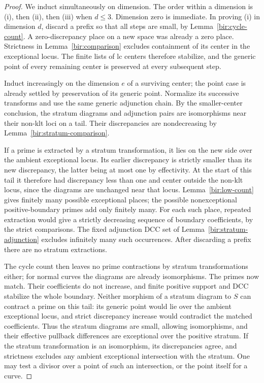 \documentclass[11pt,letterpaper]{article}
\theoremstyle{definition}
\theoremstyle{remark}
\begin{document}
\begin{proof}
We induct simultaneously on dimension.  The order within a
dimension is (i), then (ii), then (iii) when $d\leq3$.  Dimension
zero is immediate.  In proving (i) in dimension $d$, discard a
prefix so that all steps are small, by
Lemma~\ref{bir:cycle-count}.  A zero-discrepancy place on a new
space was already a zero place.  Strictness in
Lemma~\ref{bir:comparison} excludes containment of its center in
the exceptional locus.  The finite lists of lc centers therefore
stabilize, and the generic point of every remaining center is
preserved at every subsequent step.

Induct increasingly on the dimension $e$ of a surviving center;
the point case is already settled by preservation of its generic
point.  Normalize its successive transforms and use the same
generic adjunction chain.  By the smaller-center conclusion, the
stratum diagrams and adjunction pairs are isomorphisms near their
non-klt loci on a tail.  Their discrepancies are nondecreasing by
Lemma~\ref{bir:stratum-comparison}.

If a prime is extracted by a stratum transformation, it lies on
the new side over the ambient exceptional locus.  Its earlier
discrepancy is strictly smaller than its new discrepancy, the latter
being at most one by effectivity.  At the start of this tail it
therefore had discrepancy less than one and center outside the
non-klt locus, since the diagrams are unchanged near that locus.
Lemma~\ref{bir:low-count} gives finitely many possible exceptional
places; the possible nonexceptional positive-boundary primes add
only finitely many.  For each such place, repeated extraction would
give a strictly decreasing sequence of boundary coefficients, by
the strict comparisons.  The fixed adjunction DCC set of
Lemma~\ref{bir:stratum-adjunction} excludes infinitely many such
occurrences.  After discarding a prefix there are no stratum
extractions.

The cycle count then leaves no prime contractions by stratum
transformations either; for normal curves the diagrams are already
isomorphisms.  The primes now match.  Their coefficients do not
increase, and finite positive support and DCC stabilize the whole
boundary.  Neither morphism of a stratum diagram to $S$ can
contract a prime on this tail: its generic point would lie over
the ambient exceptional locus, and strict discrepancy increase
would contradict the matched coefficients.  Thus the stratum
diagrams are small, allowing isomorphisms, and their effective
pullback differences are exceptional over the positive stratum.
If the stratum transformation is an isomorphism, its discrepancies
agree, and strictness excludes any ambient exceptional intersection
with the stratum.  One may test a divisor over a point of such an
intersection, or the point itself for a curve.


\end{proof}
\end{document}
